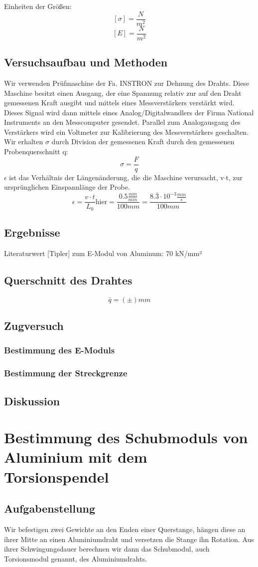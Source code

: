\documentclass{article}
\begin{document}
Einheiten der Größen:
$$[\sigma]=\frac{N}{m^2}$$
$$[E]=\frac{N}{m^2}$$
\subsection{Versuchsaufbau und Methoden}
Wir verwenden Prüfmaschine der Fa. INSTRON zur Dehnung des Drahts. Diese Maschine besitzt einen Ausgang, der eine Spannung relativ zur auf den Draht gemessenen Kraft ausgibt und mittels eines Messverstärkers verstärkt wird. Dieses Signal wird dann mittels eines Analog/Digitalwandlers der Firma National Instruments an den Messcomputer gesendet. Parallel zum Analogausgang des Verstärkers wird ein Voltmeter zur Kalibrierung des Messverstärkers geschalten.
Wir erhalten $\sigma$ durch Division der gemessenen Kraft durch den gemessenen Probenquerschnitt q:
$$ \sigma = \frac{F}{q}$$
$\epsilon$ ist das Verhältnis der Längenänderung, die die Maschine verursacht, v$\cdot$t, zur ursprünglichen Einspannlänge der Probe.
$$ \epsilon = \frac{v\cdot t}{L_0} \text{hier} = \frac{0.5\frac{mm}{min}}{100mm} = \frac{8.\bar{3}\cdot10^{-3}\frac{mm}{s}}{100mm}$$
\subsection{Ergebnisse}
Literaturwert [Tipler] zum E-Modul von Aluminum: 70 kN/mm²
\subsection*{Querschnitt des Drahtes}
$$\bar{q}=( \pm )mm$$
\subsection*{Zugversuch}
\subsubsection*{Bestimmung des E-Moduls}
\subsubsection*{Bestimmung der Streckgrenze}
\subsection{Diskussion}
\section{Bestimmung des Schubmoduls von Aluminium mit dem Torsionspendel}
\subsection{Aufgabenstellung}
Wir befestigen zwei Gewichte an den Enden einer Querstange, hängen diese an ihrer Mitte an einen Aluminiumdraht und versetzen die Stange ihn Rotation. Aus ihrer Schwingungsdauer berechnen wir dann das Schubmodul, auch Torsionsmodul genannt, des Aluminiumdrahts.
\end{document}
